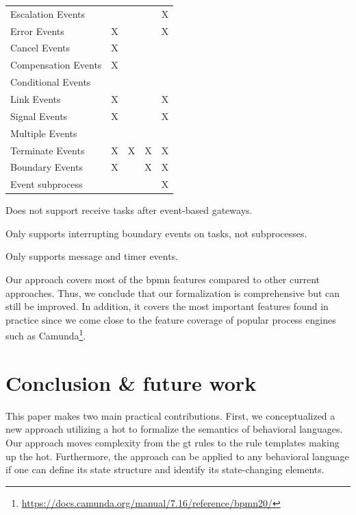 \documentclass[runningheads]{llncs}
\begin{document}
\begin{table}[htbp]
\begin{threeparttable}
\begin{tabular}{l l l l l}
      Escalation Events & & & & X\\
      Error Events & X & & & X\\
      Cancel Events & X & & &\\
      Compensation Events & X & & &\\
      Conditional Events & & & &\\
      Link Events & X & & & X\\
      Signal Events & X & & & X\\
      Multiple Events &  & & & \\
      Terminate Events & X & X & X & X\\
     Boundary Events & X\tnote{2} & & X\tnote{3} & X\\ %
      Event subprocess &  &  &  & X\\
    \end{tabular}
    \begin{tablenotes}
        \item[1] Does not support receive tasks after event-based gateways.
        \item[2] Only supports interrupting boundary events on tasks, not subprocesses.
        \item[3] Only supports message and timer events.
    \end{tablenotes}
    \end{threeparttable}
\end{table}

Our approach covers most of the \gls*{bpmn} features compared to other current approaches.
Thus, we conclude that our formalization is comprehensive but can still be improved.
In addition, it covers the most important features found in practice since we come close to the feature coverage of popular process engines such as Camunda\footnote{\url{https://docs.camunda.org/manual/7.16/reference/bpmn20/}}.

\section{Conclusion \& future work} \label{sec:conclusion}
This paper makes two main practical contributions.
First, we conceptualized a new approach utilizing a \gls*{hot} to formalize the semantics of behavioral languages.
Our approach moves complexity from the \gls*{gt} rules to the rule templates making up the \gls*{hot}.
Furthermore, the approach can be applied to any behavioral language if one can define its state structure and identify its state-changing elements.
\end{document}
